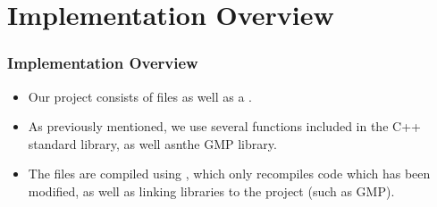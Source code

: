 \section{Implementation Overview}



\begin{frame}
\frametitle{Implementation Overview}
\begin{itemize}
\item Our project consists of  files as well
  as a .
\item As previously mentioned, we use several functions
  included in the C++ standard library, as well asnthe GMP
  library.
\item The  files are compiled using
  , which only recompiles code which has been
  modified, as well as linking libraries to the project
  (such as GMP).
\end{itemize}
\end{frame}
